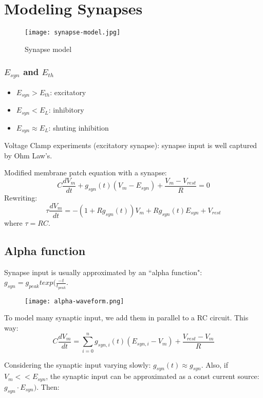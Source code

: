 \documentclass[main]{subfiles}
\begin{document}

\section{Modeling Synapses}

\begin{figure}[H]
	\centering
 	\texttt{[image: synapse-model.jpg]}
 	\caption{Synapse model}
 	\label{fig:synapse-model}
\end{figure}

\subsubsection{$E_{syn}$ and $E_{th}$}
\begin{itemize}
\item $E_{syn} > E_{th}$: excitatory
\item $E_{syn} < E_{L}$: inhibitory
\item $E_{syn} \approx E_{L}$: shuting inhibition
\end{itemize}

Voltage Clamp experiments (excitatory synapse): synapse input is well captured by Ohm Law's.

Modified membrane patch equation with a synapse:
\[ C \frac{dV_m}{dt} + g_{syn}(t)(V_m - E_{syn}) + \frac{V_m - V_{rest}}{R} = 0 \]
Rewriting:
\[ \tau \frac{dV_m}{dt} = -(1 + R g_{syn}(t)) V_m + R g_{syn}(t) E_{syn} + V_{rest} \]
where $\tau = RC$.

\subsection{Alpha function}
Synapse input is usually approximated by an ``alpha function": $g_{syn} = g_{peak} t exp(\frac{-t}{t_{peak}}$.

\begin{figure}[H]
	\centering
 	\texttt{[image: alpha-waveform.png]}
\end{figure} 

To model many synaptic input, we add them in parallel to a RC circuit. This way:
\[ C \frac{dV_m}{dt} = \sum_{i=0}^{n} g_{syn, i}(t) (E_{syn, i} - V_m) + \frac{V_{rest} -V_m}{R} \]

Considering the synaptic input varying slowly: $g_{syn}(t) \approx g_{syn}$. Also, if $V_m << E_{syn}$, the synaptic input can be approximated as a const current source: $g_{syn} \cdot E_{syn})$. Then:
\end{document}
